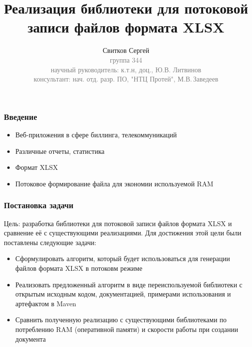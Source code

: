 \documentclass{beamer}
\begin{document}
\title{Реализация библиотеки для потоковой записи файлов формата XLSX}
\author{Свитков Сергей\\{\footnotesize\textcolor{gray}{группа 344\\научный руководитель: к.т.н, доц., Ю.В. Литвинов\\консультант: нач. отд. разр. ПО, "НТЦ Протей", М.В.\,Заведеев}}}
\frame{\titlepage}

\begin{frame}\frametitle{Введение}
\begin{itemize}
    \item Веб-приложения в сфере биллинга, телекоммуникаций
    \item Различные отчеты, статистика
    \item Формат XLSX
    \item Потоковое формирование файла для экономии используемой RAM
\end{itemize}
\end{frame}

\begin{frame}\frametitle{Постановка задачи}
Цель: разработка библиотеки для потоковой записи файлов формата XLSX и сравнение её с существующими реализациями.
Для достижения этой цели были поставлены следующие задачи:
\begin{itemize}
    \item Сформулировать алгоритм, который будет использоваться для генерации файлов формата XLSX в потоковм режиме
    \item Реализовать предложенный алгоритм в виде переиспользуемой библиотеки с открытым исходным кодом, документацией, примерами использования и артефактом в Maven
    \item Сравнить полученную реализацию с существующими библиотеками по потреблению RAM (оперативной памяти) и скорости работы при создании документа
\end{itemize}
\end{frame}
\end{document}
